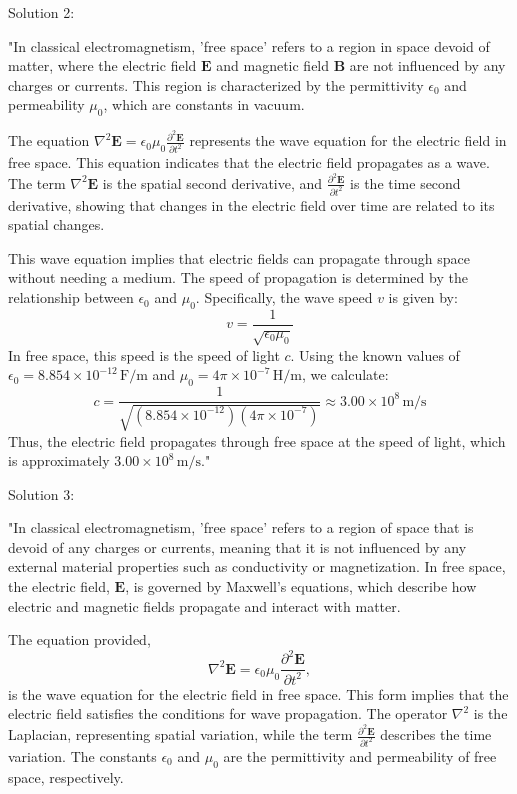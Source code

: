 Solution 2:

"In classical electromagnetism, 'free space' refers to a region in space devoid of matter, where the electric field $\mathbf{E}$ and magnetic field $\mathbf{B}$ are not influenced by any charges or currents. This region is characterized by the permittivity $\epsilon_0$ and permeability $\mu_0$, which are constants in vacuum.

The equation $\nabla^2 \mathbf{E} = \epsilon_0 \mu_0 \frac{\partial^2 \mathbf{E}}{\partial t^2}$ represents the wave equation for the electric field in free space. This equation indicates that the electric field propagates as a wave. The term $\nabla^2 \mathbf{E}$ is the spatial second derivative, and $\frac{\partial^2 \mathbf{E}}{\partial t^2}$ is the time second derivative, showing that changes in the electric field over time are related to its spatial changes.

This wave equation implies that electric fields can propagate through space without needing a medium. The speed of propagation is determined by the relationship between $\epsilon_0$ and $\mu_0$. Specifically, the wave speed $v$ is given by:
\[
v = \frac{1}{\sqrt{\epsilon_0 \mu_0}}
\]
In free space, this speed is the speed of light $c$. Using the known values of $\epsilon_0 = 8.854 \times 10^{-12} \, \mathrm{F/m}$ and $\mu_0 = 4\pi \times 10^{-7} \, \mathrm{H/m}$, we calculate:
\[
c = \frac{1}{\sqrt{(8.854 \times 10^{-12})(4\pi \times 10^{-7})}} \approx 3.00 \times 10^8 \, \mathrm{m/s}
\]
Thus, the electric field propagates through free space at the speed of light, which is approximately $3.00 \times 10^8 \, \mathrm{m/s}$."

Solution 3: 

"In classical electromagnetism, 'free space' refers to a region of space that is devoid of any charges or currents, meaning that it is not influenced by any external material properties such as conductivity or magnetization. In free space, the electric field, $\mathbf{E}$, is governed by Maxwell's equations, which describe how electric and magnetic fields propagate and interact with matter.

The equation provided,
\[
\nabla^2 \mathbf{E} = \epsilon_0 \mu_0 \frac{\partial^2 \mathbf{E}}{\partial t^2},
\]
is the wave equation for the electric field in free space. This form implies that the electric field satisfies the conditions for wave propagation. The operator $\nabla^2$ is the Laplacian, representing spatial variation, while the term $\frac{\partial^2 \mathbf{E}}{\partial t^2}$ describes the time variation. The constants $\epsilon_0$ and $\mu_0$ are the permittivity and permeability of free space, respectively.

